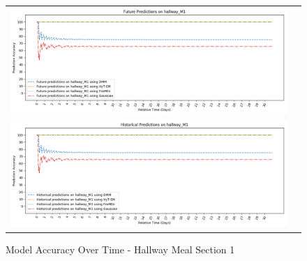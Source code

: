 \begin{figure}[!Hp]
  \begin{tabular}{cc}
    {\includegraphics[width = 6in]{images/results/Future_Predictions_on_hallway_M1.png}} \\
    {\includegraphics[width = 6in]{images/results/Historical_Predictions_on_hallway_M1.png}} \\
  \end{tabular}
  \caption{Model Accuracy Over Time - Hallway Meal Section 1}
\end{figure}



